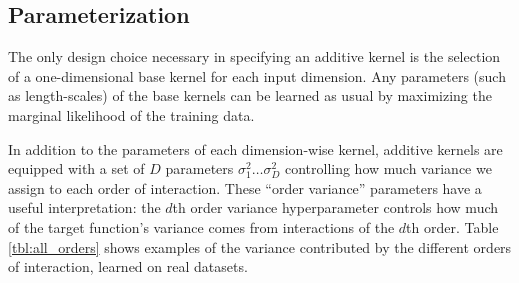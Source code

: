\subsection{Parameterization}
The only design choice necessary in specifying an additive kernel is the selection of a one-dimensional base kernel for each input dimension.
Any parameters (such as length-scales) of the base kernels can be learned as usual by maximizing the marginal likelihood of the training data.  

In addition to the parameters of each dimension-wise kernel, additive kernels are equipped with a set of $D$ parameters $\sigma_1^2 \dots \sigma_D^2$ controlling how much variance we assign to each order of interaction.
These ``order variance'' parameters have a useful interpretation:  the $d$th order variance hyperparameter controls how much of the target function's variance comes from interactions of the $d$th order.
%
%
%
%
Table \ref{tbl:all_orders} shows examples of the variance contributed by the different orders of interaction, learned on real datasets.

